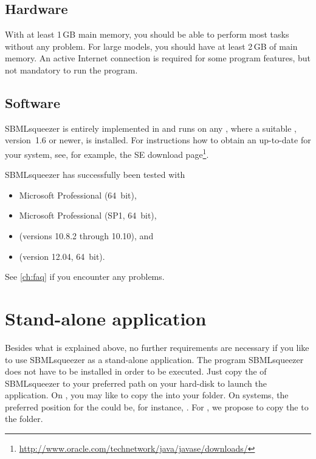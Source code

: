 \subsection{Hardware}

With at least 1\,GB main memory, you should be able to perform most tasks without any problem. For large models, you should have at least 2\,GB of main memory.
An active Internet connection is required for some program features, but not mandatory to run the program. %

\subsection{Software}\label{sec:SoftwareRequirements}

SBMLsqueezer is entirely implemented in \Java and runs on any \OS, where a 
suitable \JVM, \JDK version~1.6 or newer, is installed.
For instructions how to obtain an up-to-date \JVM for your system, see, for 
example, the \Java SE download
page\footnote{\url{http://www.oracle.com/technetwork/java/javase/downloads/}\label{fn:jvmldl}}.

SBMLsqueezer has successfully been tested with
\begin{itemize}
  \item Microsoft \WindowsSeven Professional (64~bit),
  \item Microsoft \WindowsSeven Professional (SP1, 64~bit),
  \item \MacOSX (versions 10.8.2 through 10.10), and
  \item \UbuntuLinux (version 12.04, 64~bit).
\end{itemize}
See \vref{ch:faq} if you encounter any problems.

\section{Stand-alone application}
\label{sec:StandAlone}

Besides what is explained above, no further requirements are necessary if you
like to use SBMLsqueezer as a stand-alone application.
The program SBMLsqueezer does not have to be installed in order to be executed.
Just copy the \JAR of SBMLsqueezer to your preferred path on your hard-disk
to launch the application.
On \MacOSX, you may like to copy the \JAR into your
folder.
On \Windows systems, the preferred position for the \JAR could be, for
instance,
.
For \Linux, we propose to copy the \JAR to the  folder.


